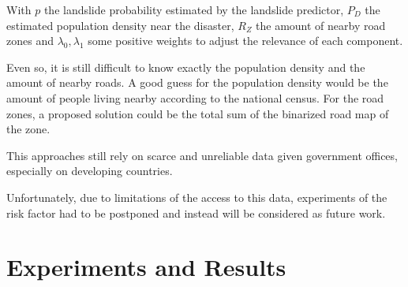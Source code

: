 \documentclass[sigconf, nonacm]{acmart}
\begin{document}
With $p$ the landslide probability estimated by the landslide predictor, $P_D$ the estimated population density near the disaster, $R_Z$ the amount of nearby road zones and $\lambda_0, \lambda_1$ some positive weights to adjust the relevance of each component.

Even so, it is still difficult to know exactly the population density and the amount of nearby roads. A good guess for the population density would be the amount of people living nearby according to the national census. For the road zones, a proposed solution could be the total sum of the binarized road map of the zone.

This approaches still rely on scarce and unreliable data given government offices, especially on developing countries. %

Unfortunately, due to limitations of the access to this data, experiments of the risk factor had to be postponed and instead will be considered as future work.


\section{Experiments and Results}



\end{document}
